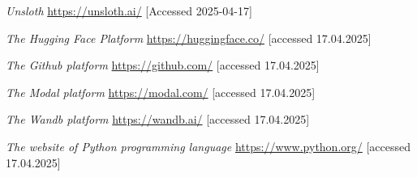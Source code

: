 \documentclass[licencjacka,en]{pracamgr}
\begin{document}
\begin{thebibliography}{99}
\textit{Unsloth}
\url{https://unsloth.ai/}
[Accessed 2025-04-17]

\textit{The Hugging Face Platform}
\url{https://huggingface.co/}
[accessed 17.04.2025]

\textit{The Github platform}
\url{https://github.com/}
[accessed 17.04.2025]

\textit{The Modal platform}
\url{https://modal.com/}
[accessed 17.04.2025]

\textit{The Wandb platform}
\url{https://wandb.ai/}
[accessed 17.04.2025]

\textit{The website of Python programming language}
\url{https://www.python.org/}
[accessed 17.04.2025]

\end{thebibliography}
\end{document}
